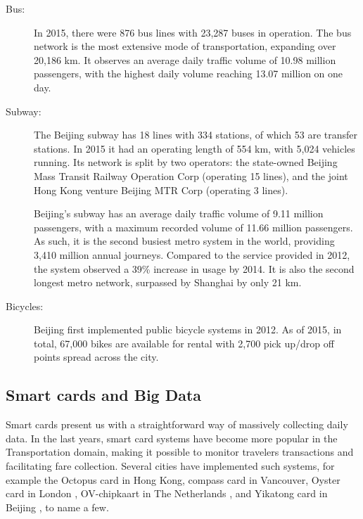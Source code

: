 \documentclass{article}
\begin{document}
\begin{description}
\item[Bus:] In 2015, there were 876 bus lines with 23,287 buses in operation. The bus network is the most extensive mode of transportation, expanding over 20,186 km. It observes an average daily traffic volume of 10.98 million passengers, with the highest daily volume reaching 13.07 million on one day. \cite{beijing2016annual}

\item[Subway:] The Beijing subway has 18 lines with 334 stations, of which 53 are transfer stations. In 2015 it had an operating length of 554 km, with 5,024 vehicles running. \cite{beijing2016annual} Its network is split by two operators: the state-owned Beijing Mass Transit Railway Operation Corp (operating 15 lines), and the joint Hong Kong venture Beijing MTR Corp (operating 3 lines).

Beijing's subway has an average daily traffic volume of 9.11 million passengers, with a maximum recorded volume of 11.66 million passengers. As such, it is the second busiest metro system in the world, providing 3,410 million annual journeys. Compared to the service provided in 2012, the system observed a 39\% increase in usage by 2014. It is also the second longest metro network, surpassed by Shanghai by only 21 km.  \cite{uitp2015world} 

\item[Bicycles:] Beijing first implemented public bicycle systems in 2012. As of 2015, in total, 67,000 bikes are available for rental with 2,700 pick up/drop off points spread across the city. \cite{beijing2016annual}
\end{description}


\subsection{Smart cards and Big Data}
Smart cards present us with a straightforward way of massively collecting daily data. In the last years, smart card systems have become more popular in the Transportation domain, making it possible to monitor travelers transactions and facilitating fare collection. Several cities have implemented such systems, for example the Octopus card in Hong Kong\cite{chau2003octopus}, compass card in Vancouver, Oyster card in London \cite{blythe2004improving}, OV-chipkaart in The Netherlands \cite{de2008analysis}, and Yikatong card in Beijing \cite{chan2010tactical}, to name a few.
\end{document}
